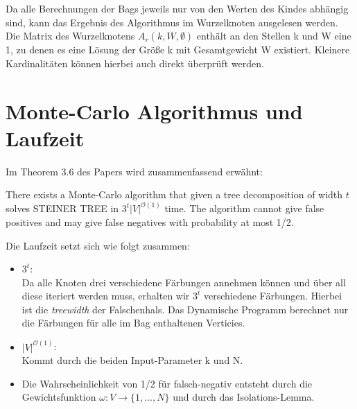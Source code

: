 Da alle Berechnungen der Bags jeweils nur von den Werten des Kindes abhängig sind, kann das Ergebnis des Algorithmus im Wurzelknoten ausgelesen werden. Die Matrix des Wurzelknotens $A_r(k,W,\emptyset)$ enthält an den Stellen k und W eine 1, zu denen es eine Lösung der Größe k mit Gesamtgewicht W existiert. Kleinere Kardinalitäten können hierbei auch direkt überprüft werden.

\section{Monte-Carlo Algorithmus und Laufzeit}
\label{sec:mc_alg}
Im Theorem 3.6 des Papers wird zusammenfassend erwähnt:
\begin{theorem}
There exists a Monte-Carlo algorithm that given a tree decomposition of width $t$ solves STEINER TREE in $3^t|V|^{\mathcal{O}(1)}$ time. The algorithm cannot give false positives and may give false negatives with probability at most 1/2.
\end{theorem}

Die Laufzeit setzt sich wie folgt zusammen:
\begin{itemize}
\item $3^t$:\\ Da alle Knoten drei verschiedene Färbungen annehmen können und über all diese iteriert werden muss, erhalten wir $3^t$ verschiedene Färbungen. Hierbei ist die \textit{treewidth} der Falschenhals. Das Dynamische Programm berechnet nur die Färbungen für alle im Bag enthaltenen Verticies.
\item $|V|^{\mathcal{O}(1)}$:\\ Kommt durch die beiden Input-Parameter k und N.
\item Die Wahrscheinlichkeit von 1/2 für falsch-negativ entsteht durch die Gewichtsfunktion $\omega:V\rightarrow \{1,\dots,N\}$ und durch das Isolations-Lemma. 
\end{itemize}
